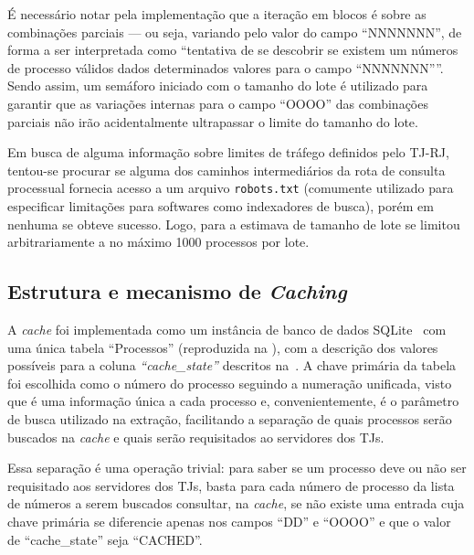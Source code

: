 É necessário notar pela implementação que a iteração em blocos é sobre as
combinações parciais --- ou seja, variando pelo valor do campo ``NNNNNNN'', de
forma a ser interpretada como ``tentativa de se descobrir se existem um números
de processo válidos dados determinados valores para o campo ``NNNNNNN''''.
Sendo assim, um semáforo iniciado com o tamanho do lote é utilizado para
garantir que as variações internas para o campo ``OOOO'' das combinações
parciais não irão acidentalmente ultrapassar o limite do tamanho do lote.

Em busca de alguma informação sobre limites de tráfego definidos pelo TJ-RJ,
tentou-se procurar se alguma dos caminhos intermediários da rota de consulta
processual fornecia acesso a um arquivo \texttt{robots.txt} (comumente
utilizado para especificar limitações para softwares como indexadores de
busca), porém em nenhuma se obteve sucesso. Logo, para a estimava de tamanho de
lote se limitou arbitrariamente a no máximo 1000 processos por lote.

\subsection{Estrutura e mecanismo de \textit{Caching}}

A \textit{cache} foi implementada como um instância de banco de dados
SQLite~\cite{tool:sqlite} com uma única tabela ``Processos'' (reproduzida na
), com a descrição dos valores possíveis
para a coluna \textit{``cache\_state''} descritos
na~. A chave primária da tabela foi escolhida
como o número do processo seguindo a numeração unificada, visto que é uma
informação única a cada processo e, convenientemente, é o parâmetro de busca
utilizado na extração, facilitando a separação de quais processos serão
buscados na \textit{cache} e quais serão requisitados ao servidores dos TJs.

Essa separação é uma operação trivial: para saber se um processo deve ou não
ser requisitado aos servidores dos TJs, basta para cada número de processo da
lista de números a serem buscados consultar, na \textit{cache}, se não existe
uma entrada cuja chave primária se diferencie apenas nos campos ``DD'' e
``OOOO'' e que o valor de ``cache\_state'' seja ``CACHED''.

